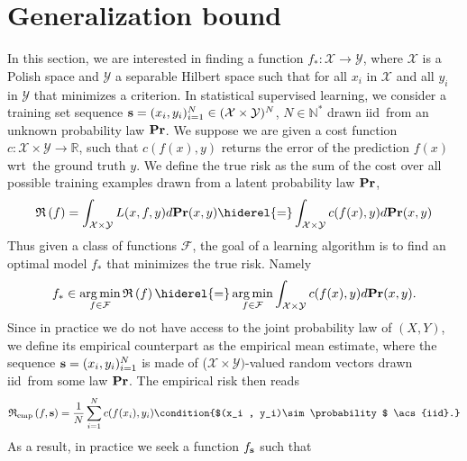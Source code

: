 
\section{Generalization bound}
\label{sec:generalization_bound}
In this section, we are interested in finding a function
$f_*:\mathcal{X}\to\mathcal{Y}$, where $\mathcal{X}$ is a Polish space and
$\mathcal{Y}$ a separable Hilbert space such that for all $x_i$ in
$\mathcal{X}$ and all $y_i$ in $\mathcal{Y}$ that minimizes a criterion. In
statistical supervised learning, we consider a training set sequence
$\boldsymbol{\mathbf{s}}=(x_i,y_i)_{i=1}^N\in(\mathcal{X}\times\mathcal{Y})^N$,
$N\in\mathbb{N^*}$ drawn \acs{iid}~from an unknown probability law
${\mathbf{{Pr}}}$. We suppose we are given a cost function
$c:\mathcal{X}\times\mathcal{Y}\to\mathbb{R}$, such that $c(f(x),y)$ returns
the error of the prediction $f(x)$ \acs{wrt}~the ground truth $y$. We define
the true risk as the sum of the cost over all possible training examples drawn
from a latent probability law ${\mathbf{{Pr}}}$,
\begin{dmath*}
    \risk{f}=\int_{\mathcal{X}\times\mathcal{Y}}L(x,f,y)d\probability(x,y)
    \hiderel{=}\int_{\mathcal{X}\times\mathcal{Y}}c(f(x), y)d\probability(x,y)
\end{dmath*}
Thus given a class of functions $\mathcal{F}$, the goal of a learning algorithm
is to find an optimal model $f_*$ that minimizes the true risk. Namely
\begin{dmath*}
    f_* \in \argmin_{f\in\mathcal{F}} \risk{f}
    \hiderel{=}\argmin_{f\in\mathcal{F}}\int_{\mathcal{X} \times
    \mathcal{Y}}c(f(x), y)d\probability(x,y).
\end{dmath*}
Since in practice we do not have access to the joint probability law of
$(X,Y)$, we define its empirical counterpart as the empirical mean estimate,
where the sequence $\boldsymbol{\mathbf{s}}=(x_i,y_i)_{i=1}^N$ is made of
($\mathcal{X}\times\mathcal{Y})$-valued random vectors drawn \acs{iid}~from
some law
${\mathbf{{Pr}}}$.
The empirical risk then reads
\begin{dmath*}
    \riskemp{f, \seq{s}}=\frac{1}{N}\sum_{i=1}^Nc(f(x_i),y_i) \condition{$(x_i
    , y_i)\sim \probability$ \acs{iid}.}
\end{dmath*}
As a result, in practice we seek a function $f_{\boldsymbol{\mathbf{s}}}$ such that
